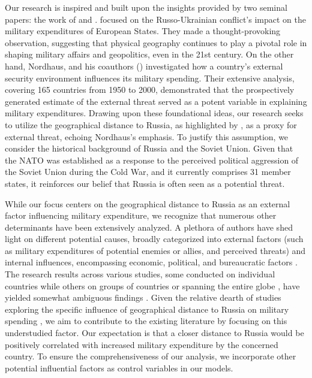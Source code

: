 \documentclass[12pt,a4paper]{article}
\begin{document}
Our research is inspired and built upon the insights provided by two seminal papers: the work of \citet{kofrovn2023} and \citet{nordhaus2012}. \citet{kofrovn2023} focused on the Russo-Ukrainian conflict's impact on the military expenditures of European States. They made a thought-provoking observation, suggesting that physical geography continues to play a pivotal role in shaping military affairs and geopolitics, even in the 21st century. On the other hand, Nordhaus, and his coauthors (\citeyear{nordhaus2012}) investigated how a country's external security environment influences its military spending. Their extensive analysis, covering 165 countries from 1950 to 2000, demonstrated that the prospectively generated estimate of the external threat served as a potent variable in explaining military expenditures. Drawing upon these foundational ideas, our research seeks to utilize the geographical distance to Russia, as highlighted by \citet{kofrovn2023}, as a proxy for external threat, echoing Nordhaus's emphasis. To justify this assumption, we consider the historical background of Russia and the Soviet Union. Given that the NATO was established as a response to the perceived political aggression of the Soviet Union during the Cold War, and it currently comprises 31 member states, it reinforces our belief that Russia is often seen as a potential threat.

While our focus centers on the geographical distance to Russia as an external factor influencing military expenditure, we recognize that numerous other determinants have been extensively analyzed. A plethora of authors have shed light on different potential causes, broadly categorized into external factors (such as military expenditures of potential enemies or allies, and perceived threats) and internal influences, encompassing economic, political, and bureaucratic factors \citep{nikolaidou2008}. The research results across various studies, some conducted on individual countries while others on groups of countries or spanning the entire globe \citep{nikolaidou2008,george2018,nordhaus2012}, have yielded somewhat ambiguous findings \citep{nikolaidou2008,odehnal2020}. 
Given the relative dearth of studies exploring the specific influence of geographical distance to Russia on military spending \citep{kofrovn2023}, we aim to contribute to the existing literature by focusing on this understudied factor. Our expectation is that a closer distance to Russia would be positively correlated with increased military expenditure by the concerned country. To ensure the comprehensiveness of our analysis, we incorporate other potential influential factors as control variables in our models. 
\end{document}
